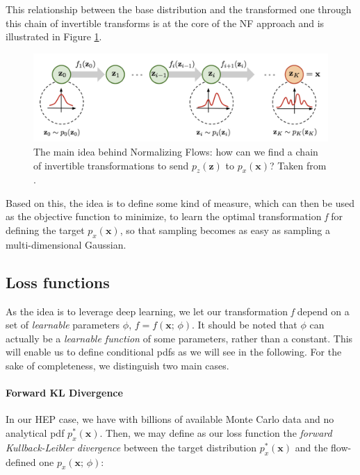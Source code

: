This relationship between the base distribution and the transformed one through this chain of invertible transforms is at the core of the NF approach and is illustrated in Figure \ref{fig:nf}.

\begin{figure}
    \centering
    \includegraphics[width=\columnwidth]{gfx/ch4/normalizing-flow.png}
    \caption[Normalizing Flows]{The main idea behind Normalizing Flows: how can we find a chain of invertible transformations to send $p_z(\mathbf{z})$ to $p_x(\mathbf{x})$? Taken from \cite{nffig}.}
    \label{fig:nf}
\end{figure}
	
Based on this, the idea is to define some kind of measure, which can then be used as the objective function to minimize, to learn the optimal transformation \emph{f} for defining the target $p_x(\mathbf{x})$, so that sampling becomes as easy as sampling a multi-dimensional Gaussian.

\subsection{Loss functions}

As the idea is to leverage deep learning, we let our transformation \emph{f} depend on a set of \emph{learnable} parameters $\phi$, $f = f(\mathbf{x};\, \phi)$. It should be noted that $\phi$ can actually be a \emph{learnable function} of some parameters, rather than a constant. This will enable us to define conditional pdfs as we will see in the following.
For the sake of completeness, we distinguish two main cases.

\paragraph{Forward KL Divergence}
In our HEP case, we have with billions of available Monte Carlo data and no analytical pdf $p_x^*(\mathbf{x})$. Then, we may define as our loss function the \emph{forward Kullback-Leibler divergence} between the target distribution $p_x^*(\mathbf{x})$ and the flow-defined one $p_x(\mathbf{x}; \, \phi)$:

